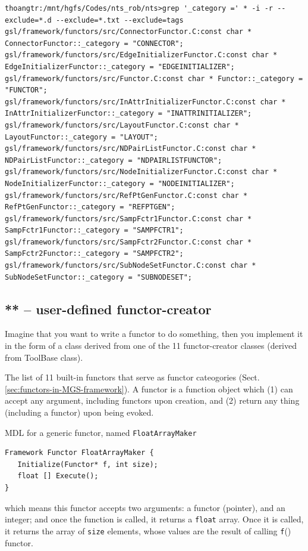 {\tiny
\begin{verbatim}
thoangtr:/mnt/hgfs/Codes/nts_rob/nts>grep '_category =' * -i -r --exclude=*.d --exclude=*.txt --exclude=tags
gsl/framework/functors/src/ConnectorFunctor.C:const char * ConnectorFunctor::_category = "CONNECTOR";
gsl/framework/functors/src/EdgeInitializerFunctor.C:const char * EdgeInitializerFunctor::_category = "EDGEINITIALIZER";
gsl/framework/functors/src/Functor.C:const char * Functor::_category = "FUNCTOR";
gsl/framework/functors/src/InAttrInitializerFunctor.C:const char * InAttrInitializerFunctor::_category = "INATTRINITIALIZER";
gsl/framework/functors/src/LayoutFunctor.C:const char * LayoutFunctor::_category = "LAYOUT";
gsl/framework/functors/src/NDPairListFunctor.C:const char * NDPairListFunctor::_category = "NDPAIRLISTFUNCTOR";
gsl/framework/functors/src/NodeInitializerFunctor.C:const char * NodeInitializerFunctor::_category = "NODEINITIALIZER";
gsl/framework/functors/src/RefPtGenFunctor.C:const char * RefPtGenFunctor::_category = "REFPTGEN";
gsl/framework/functors/src/SampFctr1Functor.C:const char * SampFctr1Functor::_category = "SAMPFCTR1";
gsl/framework/functors/src/SampFctr2Functor.C:const char * SampFctr2Functor::_category = "SAMPFCTR2";
gsl/framework/functors/src/SubNodeSetFunctor.C:const char * SubNodeSetFunctor::_category = "SUBNODESET";
\end{verbatim}
}


\subsection{** -- user-defined functor-creator}
\label{sec:functor-user-defined-how-to}

Imagine that you want to write a functor to do something, then you implement it
in the form of a class derived from one of the 11 functor-creator classes
(derived from ToolBase class). 

The list of 11 built-in functors that serve as functor cateogories
(Sect.\ref{sec:functors-in-MGS-framework}).
A functor is a function object which (1) can accept any argument, including
functors upon creation, and (2) return any thing (including a functor) upon
being evoked.

MDL for a generic functor, named \verb!FloatArrayMaker!
\begin{verbatim}
Framework Functor FloatArrayMaker {
   Initialize(Functor* f, int size);
   float [] Execute();
}
\end{verbatim}
which means this functor accepts two arguments: a functor (pointer), and an
integer; and once the function is called, it returns a \verb!float! array.
Once it is called, it returns the array of \verb!size! elements, whose values are the result of calling 
\verb!f!() functor.

